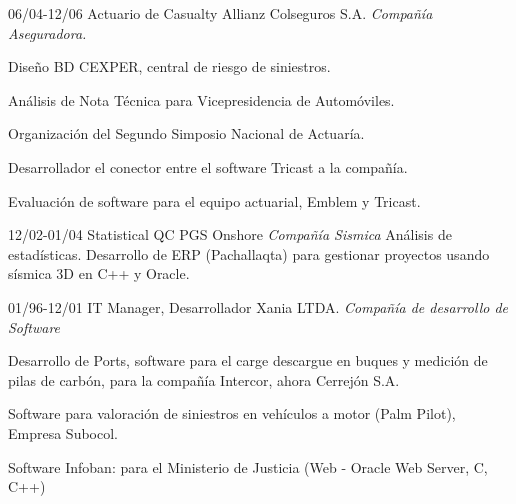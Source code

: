 \begin{entrylist}
  \entry
	{06/04-12/06}
	{Actuario de Casualty}
	{Allianz Colseguros S.A. {\sl Compañía Aseguradora.}}
	{Diseño BD CEXPER, central de riesgo de siniestros.

Análisis de Nota Técnica para Vicepresidencia de Automóviles.

Organización del Segundo Simposio Nacional de Actuaría.

Desarrollador el conector entre el software Tricast a la compañía.

Evaluación de software para el equipo actuarial, Emblem y Tricast.}


  \entry
	{12/02-01/04}
	{Statistical QC}
	{PGS Onshore {\sl Compañía Sismica}}
	{Análisis de estadísticas. Desarrollo de ERP (Pachallaqta) para gestionar proyectos
	usando sísmica 3D en C++ y Oracle.}

  \entry
	{01/96-12/01}
	{IT Manager, Desarrollador}
	{Xania LTDA. {\sl Compañía de desarrollo de Software}}
	{Desarrollo de Ports, software para el carge descargue en buques y medición de pilas de carbón,
	para la compañía Intercor, ahora Cerrejón S.A.

Software para valoración de siniestros en vehículos a motor (Palm Pilot), Empresa
Subocol.

Software Infoban: para el Ministerio de Justicia (Web - Oracle Web Server, C,
C++)



}

  \end{entrylist}
